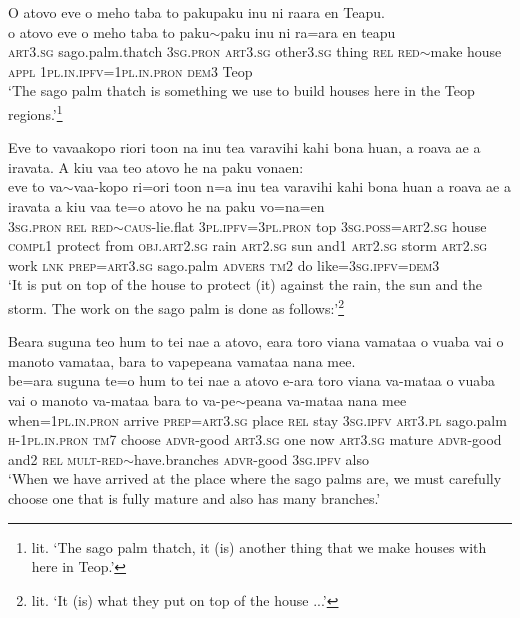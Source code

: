 \ea\label{ex:text12-1}
O atovo eve o meho taba to pakupaku inu ni raara en Teapu.\\
\gll o	atovo	eve	o	meho	taba	to	paku{$\sim$}paku	inu	ni	ra=ara	en	teapu\\
     \textsc{art}3.\textsc{sg}	sago.palm.thatch	3\textsc{sg}.\textsc{pron}	\textsc{art}3.\textsc{sg}	other3.\textsc{sg}	thing	\textsc{rel}	\textsc{red}{$\sim$}make	house	\textsc{appl}	1\textsc{pl}.\textsc{in}.\textsc{ipfv}=1\textsc{pl}.\textsc{in}.\textsc{pron}	\textsc{dem}3	Teop\\
\glt `The sago palm thatch is something we use to build houses here in the Teop regions.'\footnote{lit. `The sago palm thatch, it (is) another thing that we make houses with here in Teop.'}
\z

\ea\label{ex:text12-2}
Eve to vavaakopo riori toon na inu tea varavihi kahi bona huan, a roava ae a iravata. A kiu vaa teo atovo he na paku vonaen:\\
\gll eve	to	va{$\sim$}vaa-kopo	ri=ori	toon	n=a	inu	tea	varavihi	kahi	bona	huan	a	roava	ae	a	iravata	a	kiu	vaa	te=o	atovo	he	na	paku	vo=na=en\\
     3\textsc{sg}.\textsc{pron}	\textsc{rel}	\textsc{red}{$\sim$}\textsc{caus}-lie.flat	3\textsc{pl}.\textsc{ipfv}=3\textsc{pl}.\textsc{pron}	top	3\textsc{sg}.\textsc{poss}=\textsc{art}2.\textsc{sg}	house	\textsc{compl}1	protect	from	\textsc{obj}.\textsc{art}2.\textsc{sg}	rain	\textsc{art}2.\textsc{sg}	sun	and1	\textsc{art}2.\textsc{sg}	storm	\textsc{art}2.\textsc{sg}	work	\textsc{lnk}	\textsc{prep}=\textsc{art}3.\textsc{sg}	sago.palm	\textsc{advers}	\textsc{tm}2	do	like=3\textsc{sg}.\textsc{ipfv}=\textsc{dem}3\\
\glt `It is put on top of the house to protect (it) against the rain, the sun and the storm.  The work on the sago palm is done as follows:'\footnote{lit. `It (is) what they put on top of the house ...'}
\z

\ea\label{ex:text12-3}
Beara suguna teo hum to tei nae a atovo, eara toro viana vamataa o vuaba vai o manoto vamataa, bara to vapepeana vamataa nana mee.\\
\gll be=ara	suguna	te=o	hum	to	tei	nae	a	atovo	e-ara	toro	viana	va-mataa	o	vuaba	vai	o	manoto	va-mataa	bara	to	va-pe{$\sim$}peana	va-mataa	nana	mee\\
     when=1\textsc{pl}.\textsc{in}.\textsc{pron}	arrive	\textsc{prep}=\textsc{art}3.\textsc{sg}	place	\textsc{rel}	stay	3\textsc{sg}.\textsc{ipfv}	\textsc{art}3.\textsc{pl}	sago.palm	\textsc{h}-1\textsc{pl}.\textsc{in}.\textsc{pron}	\textsc{tm}7	choose	\textsc{advr}-good	\textsc{art}3.\textsc{sg}	one	now	\textsc{art}3.\textsc{sg}	mature	\textsc{advr}-good	and2	\textsc{rel}	\textsc{mult}-\textsc{red}{$\sim$}have.branches	\textsc{advr}-good	3\textsc{sg}.\textsc{ipfv}	also\\
\glt `When we have arrived at the place where the sago palms are, we must carefully choose one that is fully mature and also has many branches.'
\z


